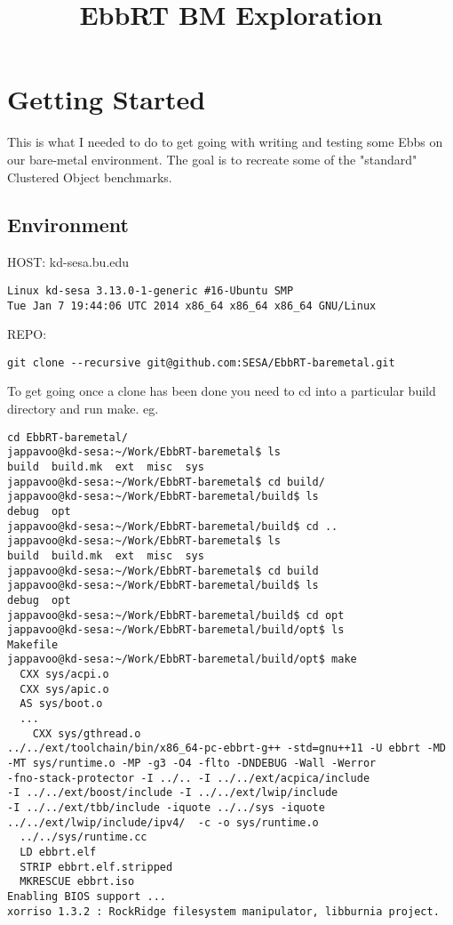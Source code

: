 \documentclass[11pt]{report}
\title{EbbRT BM Exploration}
\begin{document}
\maketitle

\chapter{Getting Started}

This is what I needed to do to get going with writing and testing
some Ebbs on our bare-metal environment.  The goal is to recreate
some of the "standard" Clustered Object benchmarks.

\section{Environment}
\begin{description}
\item{HOST:} kd-sesa.bu.edu 
\begin{verbatim}
Linux kd-sesa 3.13.0-1-generic #16-Ubuntu SMP 
Tue Jan 7 19:44:06 UTC 2014 x86_64 x86_64 x86_64 GNU/Linux
\end{verbatim}
\item{REPO:} 
\begin{verbatim}
git clone --recursive git@github.com:SESA/EbbRT-baremetal.git
\end{verbatim}
\end{description}

To get going once a clone has been done you need to cd into a particular build
directory and run make. eg.
\begin{verbatim}
cd EbbRT-baremetal/
jappavoo@kd-sesa:~/Work/EbbRT-baremetal$ ls
build  build.mk  ext  misc  sys
jappavoo@kd-sesa:~/Work/EbbRT-baremetal$ cd build/
jappavoo@kd-sesa:~/Work/EbbRT-baremetal/build$ ls
debug  opt
jappavoo@kd-sesa:~/Work/EbbRT-baremetal/build$ cd ..
jappavoo@kd-sesa:~/Work/EbbRT-baremetal$ ls
build  build.mk  ext  misc  sys
jappavoo@kd-sesa:~/Work/EbbRT-baremetal$ cd build
jappavoo@kd-sesa:~/Work/EbbRT-baremetal/build$ ls
debug  opt
jappavoo@kd-sesa:~/Work/EbbRT-baremetal/build$ cd opt
jappavoo@kd-sesa:~/Work/EbbRT-baremetal/build/opt$ ls
Makefile
jappavoo@kd-sesa:~/Work/EbbRT-baremetal/build/opt$ make
  CXX sys/acpi.o
  CXX sys/apic.o
  AS sys/boot.o
  ...
    CXX sys/gthread.o
../../ext/toolchain/bin/x86_64-pc-ebbrt-g++ -std=gnu++11 -U ebbrt -MD 
-MT sys/runtime.o -MP -g3 -O4 -flto -DNDEBUG -Wall -Werror 
-fno-stack-protector -I ../.. -I ../../ext/acpica/include 
-I ../../ext/boost/include -I ../../ext/lwip/include 
-I ../../ext/tbb/include -iquote ../../sys -iquote 
../../ext/lwip/include/ipv4/  -c -o sys/runtime.o 
  ../../sys/runtime.cc
  LD ebbrt.elf
  STRIP ebbrt.elf.stripped
  MKRESCUE ebbrt.iso
Enabling BIOS support ...
xorriso 1.3.2 : RockRidge filesystem manipulator, libburnia project.
\end{verbatim}
\end{document}
